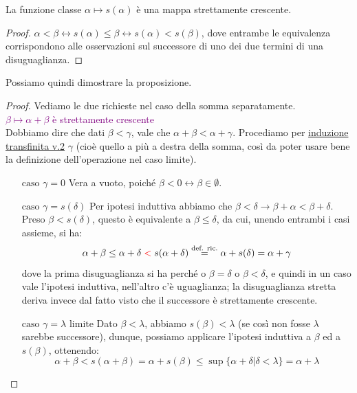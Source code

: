 \begin{note}
	La funzione classe $\alpha \mapsto s(\alpha)$ è una mappa strettamente crescente.
\end{note}

\begin{proof}
	$\alpha < \beta \leftrightarrow s(\alpha) \leq \beta \leftrightarrow s(\alpha) < s(\beta)$, dove entrambe le equivalenza corrispondono alle osservazioni sul successore di uno dei due termini di una disuguaglianza.
\end{proof}

Possiamo quindi dimostrare la proposizione.

\begin{proof}
	Vediamo le due richieste nel caso della somma separatamente.\\
	\textcolor{purple}{$\beta \mapsto \alpha + \beta$ è strettamente crescente}\\
	Dobbiamo dire che dati $\beta < \gamma$, vale che $\alpha + \beta < \alpha + \gamma$. Procediamo per \hyperref[induz_transf2]{induzione transfinita v.2} $\gamma$ (cioè quello a più a destra della somma, così da poter usare bene la definizione dell'operazione nel caso limite).
	\begin{itemize}
		\item[$\boxed{\text{caso $\gamma = 0$}}$] Vera a vuoto, poiché $\beta < 0 \leftrightarrow \beta \in \emptyset$.
		\item[$\boxed{\text{caso $\gamma = s(\delta)$}}$] Per ipotesi induttiva abbiamo che $\beta < \delta \rightarrow \beta + \alpha < \beta + \delta$. Preso $\beta < s(\delta)$, questo è equivalente a  $\beta \leq \delta$, da cui, unendo entrambi i casi assieme, si ha:
		\[ \alpha + \beta \leq \alpha + \delta \;\textcolor{red}{<}\; s(\alpha + \delta) \overset{\text{def. ric.}}{=} \alpha + s(\delta) = \alpha + \gamma
			\]
		dove la prima disuguaglianza si ha perché o $\beta = \delta$ o $\beta < \delta$, e quindi in un caso vale l'ipotesi induttiva, nell'altro c'è uguaglianza; la disuguaglianza stretta deriva invece dal fatto visto che il successore è strettamente crescente.
		\item[$\boxed{\text{caso $\gamma = \lambda$ limite}}$] Dato $\beta < \lambda$, abbiamo $s(\beta) < \lambda$ (se così non fosse $\lambda$ sarebbe successore), dunque, possiamo applicare l'ipotesi induttiva a $\beta$ ed a $s(\beta)$, ottenendo:
		\[ \alpha + \beta < s(\alpha + \beta) =  \alpha + s(\beta) \leq \sup\{\alpha + \delta | \delta < \lambda\} = \alpha + \lambda
\]
\end{itemize}
\end{proof}
